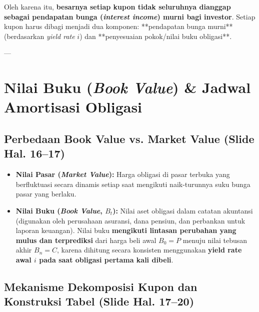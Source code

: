 \documentclass[11pt,a4paper]{article}
\begin{document}
Oleh karena itu, \textbf{besarnya setiap kupon tidak seluruhnya dianggap sebagai pendapatan bunga (\textit{interest income}) murni bagi investor}. Setiap kupon harus dibagi menjadi dua komponen: **pendapatan bunga murni** (berdasarkan \textit{yield rate} $i$) dan **penyesuaian pokok/nilai buku obligasi**.

---

\section{Nilai Buku (\textit{Book Value}) \& Jadwal Amortisasi Obligasi}

\subsection{Perbedaan Book Value vs. Market Value (Slide Hal. 16--17)}

\begin{notebox}
\begin{itemize}
    \item \textbf{Nilai Pasar (\textit{Market Value}):} Harga obligasi di pasar terbuka yang berfluktuasi secara dinamis setiap saat mengikuti naik-turunnya suku bunga pasar yang berlaku.
    \item \textbf{Nilai Buku (\textit{Book Value}, $B_t$):} Nilai aset obligasi dalam catatan akuntansi (digunakan oleh perusahaan asuransi, dana pensiun, dan perbankan untuk laporan keuangan). Nilai buku \textbf{mengikuti lintasan perubahan yang mulus dan terprediksi} dari harga beli awal $B_0 = P$ menuju nilai tebusan akhir $B_n = C$, karena dihitung secara konsisten menggunakan \textbf{yield rate awal $i$ pada saat obligasi pertama kali dibeli}.
\end{itemize}
\end{notebox}

\subsection{Mekanisme Dekomposisi Kupon dan Konstruksi Tabel (Slide Hal. 17--20)}
\end{document}
